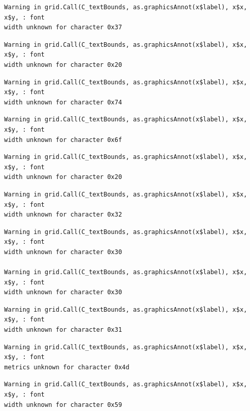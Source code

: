 \documentclass[
  letterpaper,
  DIV=11,
  numbers=noendperiod]{scrreprt}
\begin{document}
\begin{verbatim}
Warning in grid.Call(C_textBounds, as.graphicsAnnot(x$label), x$x, x$y, : font
width unknown for character 0x37
\end{verbatim}

\begin{verbatim}
Warning in grid.Call(C_textBounds, as.graphicsAnnot(x$label), x$x, x$y, : font
width unknown for character 0x20
\end{verbatim}

\begin{verbatim}
Warning in grid.Call(C_textBounds, as.graphicsAnnot(x$label), x$x, x$y, : font
width unknown for character 0x74
\end{verbatim}

\begin{verbatim}
Warning in grid.Call(C_textBounds, as.graphicsAnnot(x$label), x$x, x$y, : font
width unknown for character 0x6f
\end{verbatim}

\begin{verbatim}
Warning in grid.Call(C_textBounds, as.graphicsAnnot(x$label), x$x, x$y, : font
width unknown for character 0x20
\end{verbatim}

\begin{verbatim}
Warning in grid.Call(C_textBounds, as.graphicsAnnot(x$label), x$x, x$y, : font
width unknown for character 0x32
\end{verbatim}

\begin{verbatim}
Warning in grid.Call(C_textBounds, as.graphicsAnnot(x$label), x$x, x$y, : font
width unknown for character 0x30

Warning in grid.Call(C_textBounds, as.graphicsAnnot(x$label), x$x, x$y, : font
width unknown for character 0x30
\end{verbatim}

\begin{verbatim}
Warning in grid.Call(C_textBounds, as.graphicsAnnot(x$label), x$x, x$y, : font
width unknown for character 0x31
\end{verbatim}

\begin{verbatim}
Warning in grid.Call(C_textBounds, as.graphicsAnnot(x$label), x$x, x$y, : font
metrics unknown for character 0x4d
\end{verbatim}

\begin{verbatim}
Warning in grid.Call(C_textBounds, as.graphicsAnnot(x$label), x$x, x$y, : font
width unknown for character 0x59
\end{verbatim}
\end{document}
